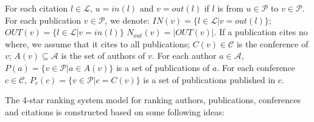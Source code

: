 \documentclass[10pt,leqno,twoside]{article}
\begin{document}
For each citation $l\in \mathcal{L}$, $u = in(l)$ and $v = out(l)$ if $l$ is from $u\in \mathcal{P}$ to $v \in \mathcal{P}$.
For each publication $v \in \mathcal{P}$, we denote: $IN(v)=\{l \in \mathcal{L}|  v=out(l)\}$; $OUT(v)=\{l \in \mathcal{L}|  v=in(l)\}$ $N_{out}(v)=|OUT(v)|$. If a publication cites no where, we assume that it cites to all publications; $C(v)\in \mathcal{C}$ is the conference of $v$;  $A(v)\subseteq \mathcal{A}$ is the set of authors of $v$. For each author $a\in \mathcal{A}$, $P(a)=\{v \in \mathcal{P}|  a\in A(v)\}$ is a set of publications of $a$.  For each conference $c\in \mathcal{C}$,
$P_c(c)=\{v \in \mathcal{P}|  c= C(v)\}$ is a set of publications published in $c$.

The 4-star ranking system model for ranking authors, publications, conferences and citations is constructed based on some following ideas:
\end{document}
